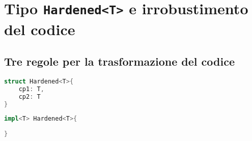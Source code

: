 \section{Tipo \texttt{Hardened<T>} e irrobustimento del codice}

\subsection{Tre regole per la trasformazione del codice}

\begin{lstlisting}[language=Rust, style=boxed]
struct Hardened<T>{
    cp1: T, 
    cp2: T
}
\end{lstlisting}


\begin{lstlisting}[language=Rust, style=boxed]
impl<T> Hardened<T>{
    
}
\end{lstlisting}